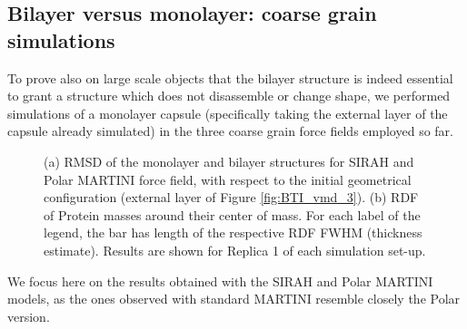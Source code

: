 \subsection{Bilayer versus monolayer: coarse grain simulations}
To prove also on large scale objects that the bilayer structure is indeed essential to grant a structure which does not disassemble or change shape, we performed simulations of a monolayer capsule (specifically taking the external layer of the capsule already simulated) in the three coarse grain force fields employed so far.
%
\begin{figure}[h!]
    \caption[Comparison of monolayer and bilayer structural properties]{(a) RMSD of the monolayer and bilayer structures for SIRAH and Polar MARTINI force field, with respect to the initial geometrical configuration (external layer of Figure \ref{fig:BTI_vmd_3}). (b) RDF of Protein masses around their center of mass. For each label of the legend, the bar has length of the respective RDF FWHM (thickness estimate). Results are shown for Replica 1 of each simulation set-up.}
\label{fig:mono_bi}
\end{figure}
We focus here on the results obtained with the SIRAH and Polar MARTINI models, as the ones observed with standard MARTINI resemble closely the Polar version.

